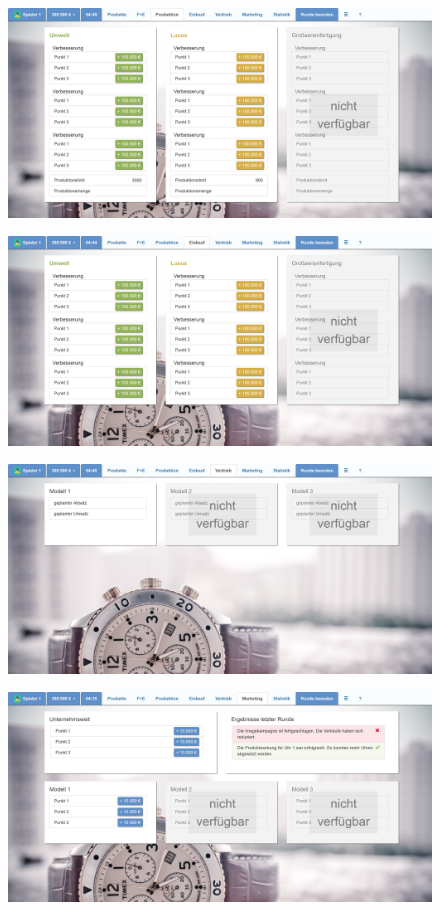 \begin{figure} 
	\centering
	\includegraphics[scale=0.1]{img/bilder_layout/MockUp4.jpg} 
\end{figure}
\begin{figure} 
	\centering
	\includegraphics[scale=0.1]{img/bilder_layout/MockUp6.jpg} 
\end{figure}
\begin{figure} 
	\centering
	\includegraphics[scale=0.1]{img/bilder_layout/MockUp7.jpg} 
\end{figure}
\begin{figure} 
	\centering
	\includegraphics[scale=0.1]{img/bilder_layout/MockUp9.jpg} 
\end{figure}
